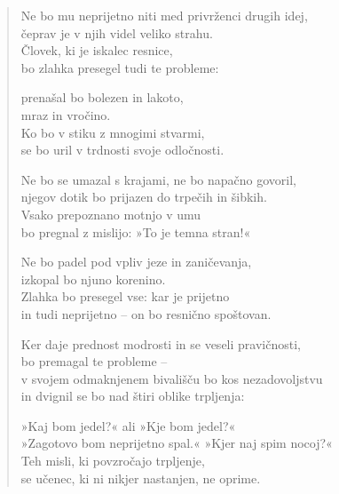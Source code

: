 \clearpage
\begin{verse}

Ne bo mu neprijetno niti med privrženci drugih idej,\\
čeprav je v njih videl veliko strahu.\\
Človek, ki je iskalec resnice,\\
bo zlahka presegel tudi te probleme:

prenašal bo bolezen in lakoto,\\
mraz in vročino.\\
Ko bo v stiku z mnogimi stvarmi,\\
se bo uril v trdnosti svoje odločnosti.

Ne bo se umazal s krajami, ne bo napačno govoril,\\
njegov dotik bo prijazen do trpečih in šibkih.\\
Vsako prepoznano motnjo v umu\\
bo pregnal z mislijo: »To je temna stran!«

Ne bo padel pod vpliv jeze in zaničevanja,\\
izkopal bo njuno korenino.\\
Zlahka bo presegel vse: kar je prijetno\\
in tudi neprijetno -- on bo resnično spoštovan.

Ker daje prednost modrosti in se veseli pravičnosti,\\
bo premagal te probleme --\\
v svojem odmaknjenem bivališču bo kos nezadovoljstvu\\
in dvignil se bo nad štiri oblike trpljenja:

»Kaj bom jedel?« ali »Kje bom jedel?«\\
»Zagotovo bom neprijetno spal.« »Kjer naj spim nocoj?«\\
Teh misli, ki povzročajo trpljenje,\\
se učenec, ki ni nikjer nastanjen, ne oprime.

\end{verse}


